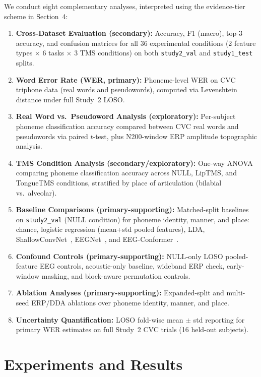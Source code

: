 \documentclass[11pt,a4paper]{article}
\begin{document}
We conduct eight complementary analyses, interpreted using the evidence-tier
scheme in Section~4:

\begin{enumerate}
  \item \textbf{Cross-Dataset Evaluation (secondary):} Accuracy, F1 (macro),
    top-3 accuracy, and confusion matrices for all 36 experimental conditions
    (2 feature types $\times$ 6 tasks $\times$ 3 TMS conditions) on both
    \texttt{study2\_val} and \texttt{study1\_test} splits.
  \item \textbf{Word Error Rate (WER, primary):} Phoneme-level WER on CVC
    triphone data (real words and pseudowords), computed via Levenshtein
    distance under full Study~2 LOSO.
  \item \textbf{Real Word vs.\ Pseudoword Analysis (exploratory):} Per-subject
    phoneme classification accuracy compared between CVC real words and
    pseudowords via paired $t$-test, plus N200-window ERP amplitude topographic
    analysis.
  \item \textbf{TMS Condition Analysis (secondary/exploratory):} One-way ANOVA
    comparing phoneme classification accuracy across NULL, LipTMS, and
    TongueTMS conditions, stratified by place of articulation (bilabial
    vs.\ alveolar).
  \item \textbf{Baseline Comparisons (primary-supporting):} Matched-split
    baselines on \texttt{study2\_val} (NULL condition) for phoneme identity,
    manner, and place: chance, logistic regression (mean+std pooled features),
    LDA, ShallowConvNet~\cite{schirrmeister2017}, EEGNet~\cite{lawhern2018},
    and EEG-Conformer~\cite{song2023}.
  \item \textbf{Confound Controls (primary-supporting):} NULL-only LOSO
    pooled-feature EEG controls, acoustic-only baseline, wideband ERP check,
    early-window masking, and block-aware permutation controls.
  \item \textbf{Ablation Analyses (primary-supporting):} Expanded-split and
    multi-seed ERP/DDA ablations over phoneme identity, manner, and place.
  \item \textbf{Uncertainty Quantification:} LOSO fold-wise mean $\pm$ std
    reporting for primary WER estimates on full Study~2 CVC trials (16
    held-out subjects).
\end{enumerate}

\section{Experiments and Results}
\end{document}

